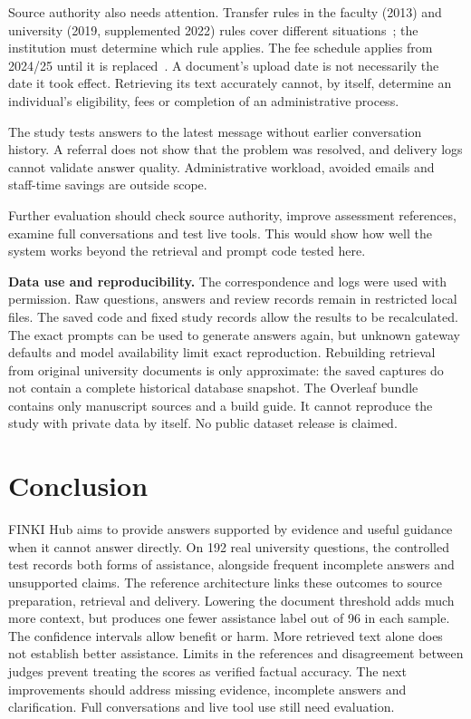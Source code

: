 \documentclass[a4paper,10pt,twocolumn]{article}
\begin{document}
Source authority also needs attention. Transfer rules in the faculty (2013) and university (2019, supplemented 2022) rules cover different situations~\cite{finki2013study,ukim2019study,ukim2022supplement}; the institution must determine which rule applies. The fee schedule applies from 2024/25 until it is replaced~\cite{finki2024fees}. A document's upload date is not necessarily the date it took effect. Retrieving its text accurately cannot, by itself, determine an individual's eligibility, fees or completion of an administrative process.

The study tests answers to the latest message without earlier conversation history. A referral does not show that the problem was resolved, and delivery logs cannot validate answer quality. Administrative workload, avoided emails and staff-time savings are outside scope.

Further evaluation should check source authority, improve assessment references, examine full conversations and test live tools. This would show how well the system works beyond the retrieval and prompt code tested here.

\textbf{Data use and reproducibility.} The correspondence and logs were used with permission. Raw questions, answers and review records remain in restricted local files. The saved code and fixed study records allow the results to be recalculated. The exact prompts can be used to generate answers again, but unknown gateway defaults and model availability limit exact reproduction. Rebuilding retrieval from original university documents is only approximate: the saved captures do not contain a complete historical database snapshot. The Overleaf bundle contains only manuscript sources and a build guide. It cannot reproduce the study with private data by itself. No public dataset release is claimed.

\section{Conclusion}
FINKI Hub aims to provide answers supported by evidence and useful guidance when it cannot answer directly. On 192 real university questions, the controlled test records both forms of assistance, alongside frequent incomplete answers and unsupported claims. The reference architecture links these outcomes to source preparation, retrieval and delivery. Lowering the document threshold adds much more context, but produces one fewer assistance label out of 96 in each sample. The confidence intervals allow benefit or harm. More retrieved text alone does not establish better assistance. Limits in the references and disagreement between judges prevent treating the scores as verified factual accuracy. The next improvements should address missing evidence, incomplete answers and clarification. Full conversations and live tool use still need evaluation.



\end{document}
